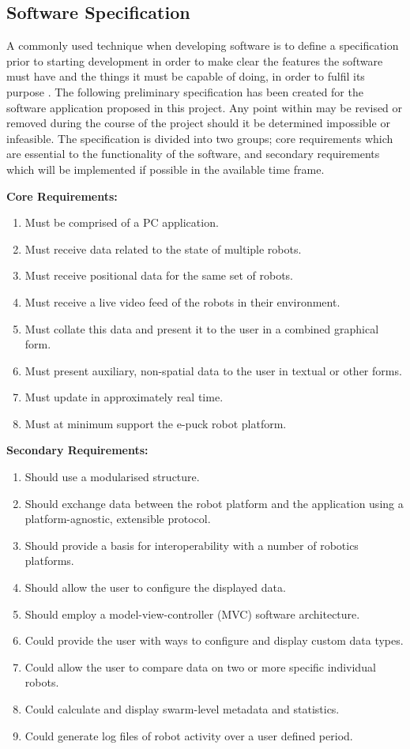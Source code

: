 \documentclass[titlepage,hidelinks,10pt]{article}
\begin{document}
\subsection{Software Specification}
A commonly used technique when developing software is to define a specification prior to starting development in order to make clear the features the software must have and the things it must be capable of doing, in order to fulfil its purpose \cite{NASAApproach}. The following preliminary specification has been created for the software application proposed in this project. Any point within may be revised or removed during the course of the project should it be determined impossible or infeasible. The specification is divided into two groups; core requirements which are essential to the functionality of the software, and secondary requirements which will be implemented if possible in the available time frame.

\noindent \textbf{Core Requirements:}
\begin{enumerate}
	\item Must be comprised of a PC application.
	\item Must receive data related to the state of multiple robots.
	\item Must receive positional data for the same set of robots.
	\item Must receive a live video feed of the robots in their environment.
	\item Must collate this data and present it to the user in a combined graphical form.
	\item Must present auxiliary, non-spatial data to the user in textual or other forms.
	\item Must update in approximately real time.
	\item Must at minimum support the e-puck robot platform.
\end{enumerate}

\noindent \textbf{Secondary Requirements:}
\begin{enumerate}
	\item Should use a modularised structure.
	\item Should exchange data between the robot platform and the application using a platform-agnostic, extensible protocol.
	\item Should provide a basis for interoperability with a number of robotics platforms.
	\item Should allow the user to configure the displayed data.
	\item Should employ a model-view-controller (MVC) software architecture.
	\item Could provide the user with ways to configure and display custom data types.
	\item Could allow the user to compare data on two or more specific individual robots.
	\item Could calculate and display swarm-level metadata and statistics.
	\item Could generate log files of robot activity over a user defined period.
\end{enumerate}
\end{document}
